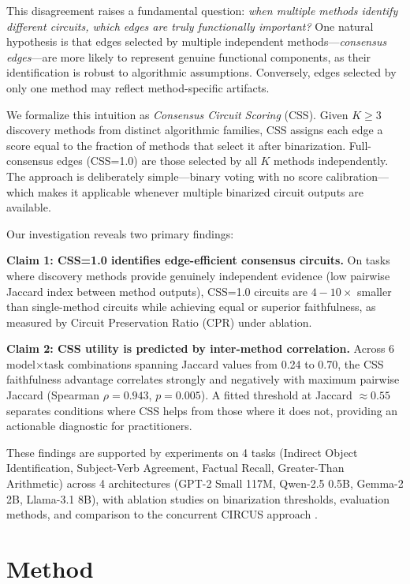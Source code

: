\documentclass[11pt]{article}
\newcommand{\css}{\textsc{CSS}}
\newcommand{\cssone}{\textsc{CSS}{=}1.0}
\begin{document}
This disagreement raises a fundamental question: \emph{when multiple methods identify different circuits, which edges are truly functionally important?} One natural hypothesis is that edges selected by multiple independent methods---\emph{consensus edges}---are more likely to represent genuine functional components, as their identification is robust to algorithmic assumptions. Conversely, edges selected by only one method may reflect method-specific artifacts.

We formalize this intuition as \emph{Consensus Circuit Scoring} (\css{}). Given $K \geq 3$ discovery methods from distinct algorithmic families, \css{} assigns each edge a score equal to the fraction of methods that select it after binarization. Full-consensus edges (\cssone{}) are those selected by all $K$ methods independently. The approach is deliberately simple---binary voting with no score calibration---which makes it applicable whenever multiple binarized circuit outputs are available.

Our investigation reveals two primary findings:

\textbf{Claim 1: \cssone{} identifies edge-efficient consensus circuits.} On tasks where discovery methods provide genuinely independent evidence (low pairwise Jaccard index between method outputs), \cssone{} circuits are $4{-}10\times$ smaller than single-method circuits while achieving equal or superior faithfulness, as measured by Circuit Preservation Ratio (CPR) under ablation.

\textbf{Claim 2: \css{} utility is predicted by inter-method correlation.} Across 6 model$\times$task combinations spanning Jaccard values from 0.24 to 0.70, the \css{} faithfulness advantage correlates strongly and negatively with maximum pairwise Jaccard (Spearman $\rho = 0.943$, $p = 0.005$). A fitted threshold at Jaccard $\approx 0.55$ separates conditions where \css{} helps from those where it does not, providing an actionable diagnostic for practitioners.

These findings are supported by experiments on 4 tasks (Indirect Object Identification, Subject-Verb Agreement, Factual Recall, Greater-Than Arithmetic) across 4 architectures (GPT-2 Small 117M, Qwen-2.5 0.5B, Gemma-2 2B, Llama-3.1 8B), with ablation studies on binarization thresholds, evaluation methods, and comparison to the concurrent CIRCUS approach \citep{parekh2026circus}.

\section{Method}
\label{sec:method}
\end{document}
